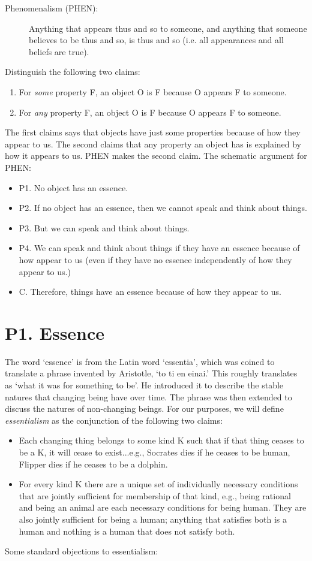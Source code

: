 \documentclass[article,oneside]{memoir}
\begin{document}
\begin{description}
\item[Phenomenalism (PHEN):] Anything that appears thus and so to someone, and anything that someone believes to be thus and so, is thus and so (i.e. all appearances and all beliefs are true).
\end{description}


Distinguish the following two claims:


\begin{enumerate}
\item For \emph{some} property F, an object O is F because O appears F to someone. 
\item For \emph{any} property F,  an object O is F because O appears F to someone. 
\end{enumerate}
The first claims says that objects have just some properties because of how they appear to us. The second claims that any property an object has is explained by how it appears to us. PHEN makes the second claim. The schematic argument for PHEN:
\begin{itemize}
\item P1. No object has an essence.  
\item P2. If no object has an essence, then we cannot speak and think about things. 
\item P3. But we can speak and think about things. 
\item P4. We can speak and think about things if they have an essence because of how appear to us (even if they have no essence independently of how they appear to us.) 
\item C. Therefore, things have an essence because of how they appear to us.  
\end{itemize}

\section{P1. Essence}

The word `essence'  is from the Latin word `essentia', which was coined to translate a phrase invented by Aristotle, `to ti en einai.' This roughly translates as `what it was for something to be'. He introduced it to describe the stable natures that changing being have over time. The phrase was then extended to discuss the natures of non-changing beings. For our purposes, we will define \emph{essentialism} as the conjunction of the following two claims:
\begin{itemize}
\item Each changing thing belongs to some kind K such that if that thing ceases to be a K, it will cease to exist...e.g., Socrates dies if he ceases to be human, Flipper dies if he ceases to be a dolphin. 
\item For every kind K there are a unique set of individually necessary conditions that are jointly sufficient for membership of that kind, e.g., being rational and being an animal are each necessary conditions for being human. They are also jointly sufficient for being a human; anything that satisfies both is a human and nothing is a human that does not satisfy both. 
\end{itemize}
Some standard objections to essentialism: 
\end{document}

